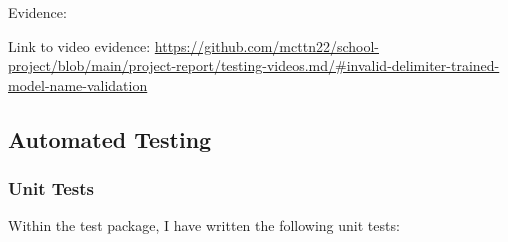 \documentclass[./project-report/src/latex/project-report.tex]{subfiles}
\begin{document}
\begin{itemize}
		\vspace{5mm}

		Evidence:
		\begin{figure}[h!]
		\centering
		\end{figure}

		\begin{sloppypar}
		Link to video evidence: \url{https://github.com/mcttn22/school-project/blob/main/project-report/testing-videos.md/#invalid-delimiter-trained-model-name-validation}
		\end{sloppypar}
\end{itemize}

\subsection{Automated Testing}

\subsubsection{Unit Tests}

Within the test package, I have written the following unit tests:
\end{document}
